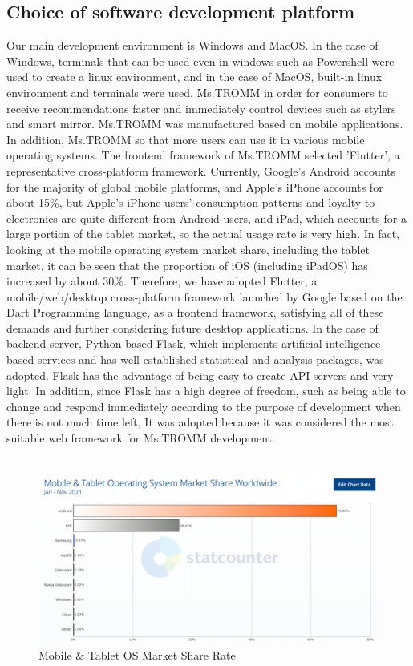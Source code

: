 \documentclass[conference]{IEEEtran}
\begin{document}
\subsection{Choice of software development platform}
Our main development environment is Windows and MacOS. In the case of Windows, terminals that can be used even in windows such as Powershell were used to create a linux environment, and in the case of MacOS, built-in linux environment and terminals were used. Ms.TROMM in order for consumers to receive recommendations faster and immediately control devices such as stylers and smart mirror. Ms.TROMM was manufactured based on mobile applications. In addition, Ms.TROMM so that more users can use it in various mobile operating systems. The frontend framework of Ms.TROMM selected 'Flutter', a representative cross-platform framework. Currently, Google's Android accounts for the majority of global mobile platforms, and Apple's iPhone accounts for about 15\%, but Apple's iPhone users' consumption patterns and loyalty to electronics are quite different from Android users, and iPad, which accounts for a large portion of the tablet market, so the actual usage rate is very high. In fact, looking at the mobile operating system market share, including the tablet market, it can be seen that the proportion of iOS (including iPadOS) has increased by about 30\%. Therefore, we have adopted Flutter, a mobile/web/desktop cross-platform framework launched by Google based on the Dart Programming language, as a frontend framework, satisfying all of these demands and further considering future desktop applications. In the case of backend server, Python-based Flask, which implements artificial intelligence-based services and has well-established statistical and analysis packages, was adopted. Flask has the advantage of being easy to create API servers and very light. In addition, since Flask has a high degree of freedom, such as being able to change and respond immediately according to the purpose of development when there is not much time left, It was adopted because it was considered the most suitable web framework for Ms.TROMM development.\\ \\

\begin{figure}[]
\centerline{\includegraphics{그림1.png}}
\caption{Mobile \& Tablet OS Market Share Rate}
\label{fig}
\end{figure}
\end{document}
